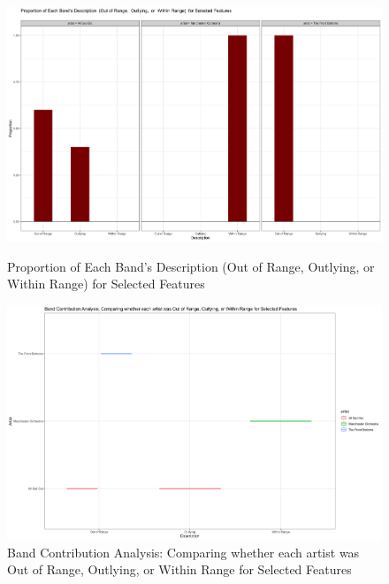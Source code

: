 \documentclass{article}\usepackage[]{graphicx}\usepackage[]{xcolor}
\begin{document}
\begin{figure}[!htbp]
    \centering
    \includegraphics[width=1.05\textwidth, trim=0 0 0 50, clip]{bar.png}
    \caption{Proportion of Each Band's Description  (Out of Range,  Outlying,  or  Within Range)  for Selected Features}
    \vspace{0.20cm} 
    \includegraphics[width=1.05\textwidth, trim=0 0 0 50, clip]{Plot.png}
    \caption{Band Contribution Analysis: Comparing whether each artist was Out of Range, Outlying, or Within Range for Selected Features}
\end{figure}
\end{document}
